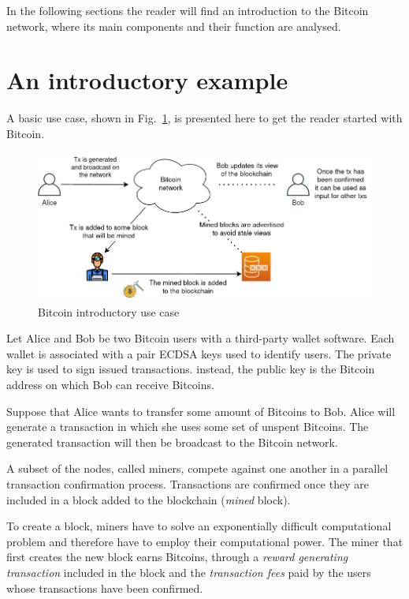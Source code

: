In the following sections the reader will find an introduction to the Bitcoin network, where its main components and their function are analysed.


\section{An introductory example}\label{sec:useexample}
A basic use case, shown in Fig.~\ref{fig:basicexample}, is presented here to get the reader started with Bitcoin.

\begin{figure}[h!]
	\includegraphics[width=.90\textwidth]{pict/basicexample.png}
	\centering
	\caption{Bitcoin introductory use case}
	\label{fig:basicexample}
\end{figure}

Let Alice and Bob be two Bitcoin users with a third-party wallet software. Each wallet is associated with a pair ECDSA keys used to identify users. The private key is used to sign issued transactions. instead, the public key is the Bitcoin address on which Bob can receive Bitcoins.

Suppose that Alice wants to transfer some amount of Bitcoins to Bob. Alice will generate a transaction in which she uses some set of unspent Bitcoins. The generated transaction will then be broadcast to the Bitcoin network.

A subset of the nodes, called miners, compete against one another in a parallel transaction confirmation process. Transactions are confirmed once they are included in a block added to the blockchain (\emph{mined} block).

To create a block, miners have to solve an exponentially difficult computational problem and therefore have to employ their computational power. The miner that first creates the new block earns Bitcoins, through a \emph{reward generating transaction} included in the block and the \emph{transaction fees} paid by the users whose transactions have been confirmed.

